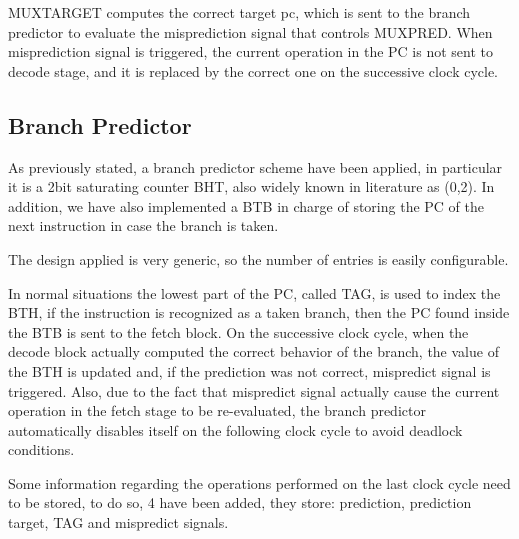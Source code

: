 \documentclass[12pt]{article}
\begin{document}
MUXTARGET computes the correct target pc, which is sent to the branch predictor to evaluate the misprediction signal that controls MUXPRED.
When misprediction signal is triggered, the current operation in the PC is not sent to decode stage, and it is replaced by the correct one on the successive clock cycle.

\subsection{Branch Predictor}
As previously stated, a branch predictor scheme have been applied, in particular it is a 2bit saturating counter BHT, also widely known in literature as (0,2). In addition, we have also implemented a BTB in charge of storing the PC of the next instruction in case the branch is taken.

The design applied is very generic, so the number of entries is easily configurable.

In normal situations the lowest part of the PC, called TAG, is used to index the BTH, if the instruction is recognized as a taken branch, then the PC found inside the BTB is sent to the fetch block. On the successive clock cycle, when the decode block actually computed the correct behavior of the branch, the value of the BTH is updated and, if the prediction was not correct, mispredict signal is triggered.
Also, due to the fact that mispredict signal actually cause the current operation in the fetch stage to be re-evaluated, the branch predictor automatically disables itself on the following clock cycle to avoid deadlock conditions.

Some information regarding the operations performed on the last clock cycle need to be stored, to do so, 4 have been added, they store: prediction, prediction target, TAG and mispredict signals.
\end{document}
